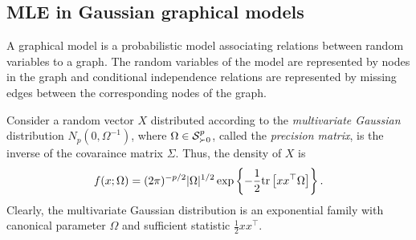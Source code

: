 \subsection{MLE in Gaussian graphical models}

A graphical model is a probabilistic model associating relations between random variables to a graph. The random variables of the model are represented by nodes in the graph and conditional independence relations are represented by missing edges between the corresponding nodes of the graph.

Consider a random vector $X$ distributed according to the \textit{multivariate Gaussian} distribution $N_p(0, \Omega^{-1})$, where $\Omega \in \S^p_{\succ 0}$, called the \textit{precision matrix}, is the inverse of the covaraince matrix $\Sigma$. Thus, the density of $X$ is
\begin{equation} \label{eq-density-gaussian}
    f(x; \Omega) = (2\pi)^{-p/2} |\Omega|^{1/2} \expfc{-\frac{1}{2} \trB{xx^\top \Omega} }.
\end{equation}
Clearly, the multivariate Gaussian distribution is an exponential family with canonical parameter $\Omega$ and sufficient statistic $\frac{1}{2}xx^\top$. 

